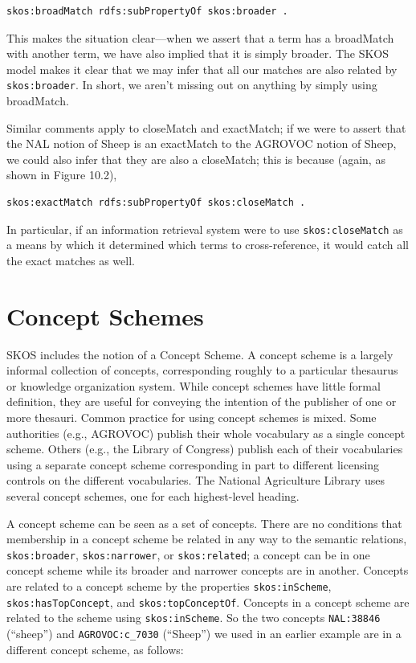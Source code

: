 \begin{lstlisting}
skos:broadMatch rdfs:subPropertyOf skos:broader .
\end{lstlisting}

This makes the situation clear---when we assert that a term has a
broadMatch with another term, we have also implied that it is simply
broader. The SKOS model makes it clear that we may infer that all our
matches are also related by \texttt{skos:broader}. In short, we aren't missing
out on anything by simply using broadMatch.

Similar comments apply to closeMatch and exactMatch; if we were to
assert that the NAL
notion of Sheep is an exactMatch to the AGROVOC notion of Sheep, we
could also infer that they are also a closeMatch; this is because
(again, as shown in Figure 10.2),

\begin{lstlisting}
skos:exactMatch rdfs:subPropertyOf skos:closeMatch .
\end{lstlisting}

In particular, if an information retrieval system were to use
\texttt{skos:closeMatch} as a means by which it determined which terms to
cross-reference, it would catch all the exact matches as well.

\section{Concept Schemes}

SKOS includes the notion of a Concept Scheme. A concept scheme is a
largely informal collection of concepts, corresponding roughly to a
particular thesaurus or knowledge organization system. While concept
schemes have little formal definition, they are useful for conveying the
intention of the publisher of one or more thesauri. Common practice for
using concept schemes is mixed. Some authorities (e.g., AGROVOC) publish
their whole vocabulary as a single concept scheme. Others (e.g., the
Library of Congress) publish each of their vocabularies using a separate
concept scheme
corresponding in part to different licensing controls on the different
vocabularies. The National
Agriculture Library uses several concept schemes, one for each
highest-level heading.

A concept scheme can be seen as a set of concepts. There are no
conditions that membership in a concept scheme be related in any way to
the semantic relations, \texttt{skos:broader}, \texttt{skos:narrower}, or \texttt{skos:related}; a
concept can be in one concept scheme while its broader and narrower
concepts are in another. Concepts are related to a concept scheme by the
properties \texttt{skos:inScheme}, \texttt{skos:hasTopConcept}, and \texttt{skos:topConceptOf}.
Concepts in a concept scheme are related to the scheme using
\texttt{skos:inScheme}. So the two
concepts \texttt{NAL:38846} (``sheep'') and \texttt{AGROVOC:c\_7030} (``Sheep'') we used
in an earlier example are in a different concept scheme, as follows:

